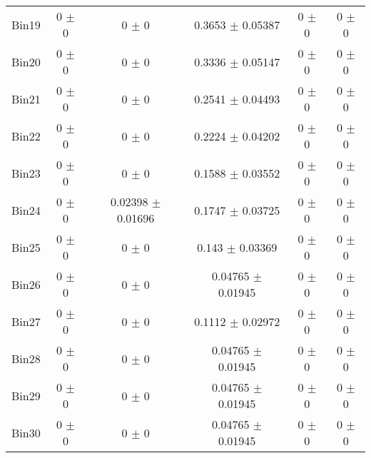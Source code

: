 \begin{tabular}{@{\extracolsep{4pt}}lccccc@{}}
     Bin19 & 0 $\pm$ 0 & 0 $\pm$ 0 & 0.3653 $\pm$ 0.05387 & 0 $\pm$ 0 & 0 $\pm$ 0 \\ 
     Bin20 & 0 $\pm$ 0 & 0 $\pm$ 0 & 0.3336 $\pm$ 0.05147 & 0 $\pm$ 0 & 0 $\pm$ 0 \\ 
     Bin21 & 0 $\pm$ 0 & 0 $\pm$ 0 & 0.2541 $\pm$ 0.04493 & 0 $\pm$ 0 & 0 $\pm$ 0 \\ 
     Bin22 & 0 $\pm$ 0 & 0 $\pm$ 0 & 0.2224 $\pm$ 0.04202 & 0 $\pm$ 0 & 0 $\pm$ 0 \\ 
     Bin23 & 0 $\pm$ 0 & 0 $\pm$ 0 & 0.1588 $\pm$ 0.03552 & 0 $\pm$ 0 & 0 $\pm$ 0 \\ 
     Bin24 & 0 $\pm$ 0 & 0.02398 $\pm$ 0.01696 & 0.1747 $\pm$ 0.03725 & 0 $\pm$ 0 & 0 $\pm$ 0 \\ 
     Bin25 & 0 $\pm$ 0 & 0 $\pm$ 0 & 0.143 $\pm$ 0.03369 & 0 $\pm$ 0 & 0 $\pm$ 0 \\ 
     Bin26 & 0 $\pm$ 0 & 0 $\pm$ 0 & 0.04765 $\pm$ 0.01945 & 0 $\pm$ 0 & 0 $\pm$ 0 \\ 
     Bin27 & 0 $\pm$ 0 & 0 $\pm$ 0 & 0.1112 $\pm$ 0.02972 & 0 $\pm$ 0 & 0 $\pm$ 0 \\ 
     Bin28 & 0 $\pm$ 0 & 0 $\pm$ 0 & 0.04765 $\pm$ 0.01945 & 0 $\pm$ 0 & 0 $\pm$ 0 \\ 
     Bin29 & 0 $\pm$ 0 & 0 $\pm$ 0 & 0.04765 $\pm$ 0.01945 & 0 $\pm$ 0 & 0 $\pm$ 0 \\ 
     Bin30 & 0 $\pm$ 0 & 0 $\pm$ 0 & 0.04765 $\pm$ 0.01945 & 0 $\pm$ 0 & 0 $\pm$ 0 \\ 
\hline\hline
  \end{tabular}
